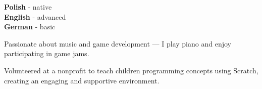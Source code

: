 \documentclass[9pt]{config}
\begin{document}
\vspace{12pt}


\begin{minipage}[t]{0.3\textwidth}
  \vspace{-\baselineskip}


  \textbf{Polish} - native\\
  \textbf{English} - advanced\\
  \textbf{German} - basic\\
\end{minipage}
\hfill
\begin{minipage}[t]{0.3\textwidth}
  \vspace{-\baselineskip}


  Passionate about music and game development — I play piano and
  enjoy participating in game jams.
\end{minipage}
\hfill
\begin{minipage}[t]{0.3\textwidth}
  \vspace{-\baselineskip}


  Volunteered at a nonprofit to teach children programming concepts
  using Scratch, creating an engaging and supportive environment.
\end{minipage}

\end{document}
